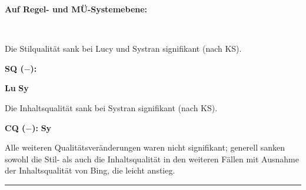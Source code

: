 \noindent
\parbox[t]{.8\textwidth}{\textbf{Auf Regel- und MÜ-Systemebene:}}\\
\parbox[t]{.8\textwidth}{
Die Stilqualität sank bei Lucy und Systran signifikant (nach KS).
}
\parbox[t]{.04\textwidth}{}
\colorbox{smGreen}{\parbox[t]{.15\textwidth}{
{ \textbf{SQ ($-$):}}

{ \textbf{Lu}} \textbf{Sy}
}}

\medskip
\noindent
\parbox[t]{.8\textwidth}{
Die Inhaltsqualität sank bei Systran signifikant (nach KS).
}
\parbox[t]{.04\textwidth}{}
\colorbox{smGreen}{\parbox[t]{.15\textwidth}{
{ \textbf{CQ ($-$):}} \textbf{Sy}
}}

\medskip
\noindent
\parbox[t]{.8\textwidth}{
Alle weiteren Qualitätsveränderungen waren nicht signifikant; generell sanken sowohl die Stil- als auch die Inhaltsqualität in den weiteren Fällen mit Ausnahme der Inhaltsqualität von Bing, die leicht anstieg.
}

\hrule
